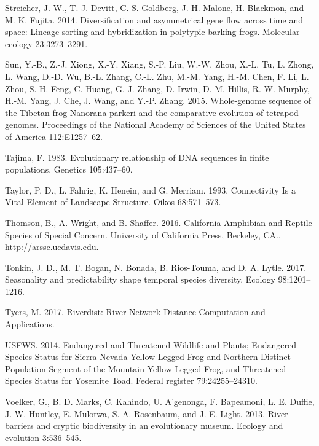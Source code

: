\documentclass[proquest,12pt,final]{ucthesis-CA2012} %
\begin{document}
\begin{ucmainmatter}
\leavevmode\hypertarget{ref-streicher_diversification_2014}{}%
Streicher, J. W., T. J. Devitt, C. S. Goldberg, J. H. Malone, H.
Blackmon, and M. K. Fujita. 2014. Diversification and asymmetrical gene
flow across time and space: Lineage sorting and hybridization in
polytypic barking frogs. Molecular ecology 23:3273--3291.

\leavevmode\hypertarget{ref-sun_whole-genome_2015}{}%
Sun, Y.-B., Z.-J. Xiong, X.-Y. Xiang, S.-P. Liu, W.-W. Zhou, X.-L. Tu,
L. Zhong, L. Wang, D.-D. Wu, B.-L. Zhang, C.-L. Zhu, M.-M. Yang, H.-M.
Chen, F. Li, L. Zhou, S.-H. Feng, C. Huang, G.-J. Zhang, D. Irwin, D. M.
Hillis, R. W. Murphy, H.-M. Yang, J. Che, J. Wang, and Y.-P. Zhang.
2015. Whole-genome sequence of the Tibetan frog Nanorana parkeri and the
comparative evolution of tetrapod genomes. Proceedings of the National
Academy of Sciences of the United States of America 112:E1257--62.

\leavevmode\hypertarget{ref-tajima_evolutionary_1983}{}%
Tajima, F. 1983. Evolutionary relationship of DNA sequences in finite
populations. Genetics 105:437--60.

\leavevmode\hypertarget{ref-taylor_connectivity_1993}{}%
Taylor, P. D., L. Fahrig, K. Henein, and G. Merriam. 1993. Connectivity
Is a Vital Element of Landscape Structure. Oikos 68:571--573.

\leavevmode\hypertarget{ref-thomson_california_2016}{}%
Thomson, B., A. Wright, and B. Shaffer. 2016. California Amphibian and
Reptile Species of Special Concern. University of California Press,
Berkeley, CA., http://arssc.ucdavis.edu.

\leavevmode\hypertarget{ref-tonkin_seasonality_2017}{}%
Tonkin, J. D., M. T. Bogan, N. Bonada, B. Rios-Touma, and D. A. Lytle.
2017. Seasonality and predictability shape temporal species diversity.
Ecology 98:1201--1216.

\leavevmode\hypertarget{ref-tyers_riverdist_2017}{}%
Tyers, M. 2017. Riverdist: River Network Distance Computation and
Applications.

\leavevmode\hypertarget{ref-usfws_endangered_2014}{}%
USFWS. 2014. Endangered and Threatened Wildlife and Plants; Endangered
Species Status for Sierra Nevada Yellow-Legged Frog and Northern
Distinct Population Segment of the Mountain Yellow-Legged Frog, and
Threatened Species Status for Yosemite Toad. Federal register
79:24255--24310.

\leavevmode\hypertarget{ref-voelker_river_2013}{}%
Voelker, G., B. D. Marks, C. Kahindo, U. A'genonga, F. Bapeamoni, L. E.
Duffie, J. W. Huntley, E. Mulotwa, S. A. Rosenbaum, and J. E. Light.
2013. River barriers and cryptic biodiversity in an evolutionary museum.
Ecology and evolution 3:536--545.


\end{ucmainmatter}
\end{document}

